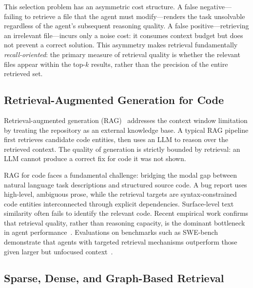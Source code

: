 This selection problem has an asymmetric cost structure. A false negative---failing to retrieve a file that the agent must modify---renders the task unsolvable regardless of the agent's subsequent reasoning quality. A false positive---retrieving an irrelevant file---incurs only a noise cost: it consumes context budget but does not prevent a correct solution. This asymmetry makes retrieval fundamentally \emph{recall-oriented}: the primary measure of retrieval quality is whether the relevant files appear within the top-$k$ results, rather than the precision of the entire retrieved set.

\subsection{Retrieval-Augmented Generation for Code}
\label{sec:rag}

Retrieval-augmented generation (RAG)~\cite{lewis2020rag} addresses the context window limitation by treating the repository as an external knowledge base. A typical RAG pipeline first retrieves candidate code entities, then uses an LLM to reason over the retrieved context. The quality of generation is strictly bounded by retrieval: an LLM cannot produce a correct fix for code it was not shown.

RAG for code faces a fundamental challenge: bridging the modal gap between natural language task descriptions and structured source code. A bug report uses high-level, ambiguous prose, while the retrieval targets are syntax-constrained code entities interconnected through explicit dependencies. Surface-level text similarity often fails to identify the relevant code. Recent empirical work confirms that retrieval quality, rather than reasoning capacity, is the dominant bottleneck in agent performance~\cite{yang2024swebench}. Evaluations on benchmarks such as SWE-bench demonstrate that agents with targeted retrieval mechanisms outperform those given larger but unfocused context~\cite{yang2024swebench}.

\subsection{Sparse, Dense, and Graph-Based Retrieval}
\label{sec:retrieval-families}

